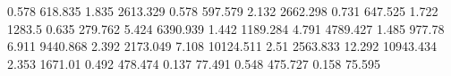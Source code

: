 0.578      618.835    %
1.835      2613.329   %
0.578      597.579    %
2.132      2662.298   %
0.731      647.525    %
1.722      1283.5     %
0.635      279.762    %
5.424      6390.939   %
1.442      1189.284   %
4.791      4789.427   %
1.485      977.78     %
6.911      9440.868   %
2.392      2173.049   %
7.108      10124.511  %
2.51       2563.833   %
12.292     10943.434  %
2.353      1671.01    %
0.492      478.474    %
0.137      77.491     %
0.548      475.727    %
0.158      75.595     %
